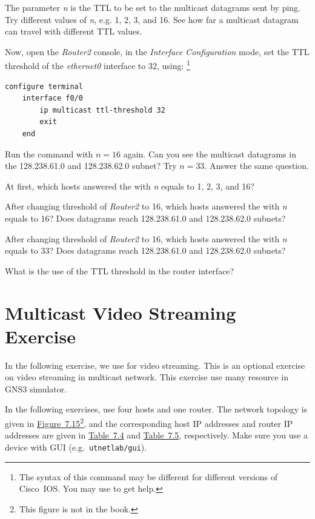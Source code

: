 \documentclass{../UTNetLab}
\begin{document}
The parameter \textit{n} is the TTL to be set to the multicast datagrams sent by ping.
Try different values of \textit{n}, e.g. 1, 2, 3, and 16.
See how far a multicast datagram can travel with different TTL values.

Now, open the \textit{Router2} console, in the \textit{Interface Configuration} mode, set the TTL threshold of the \textit{ethernet0} interface to 32, using:
\footnote{The syntax of this command may be different for different versions of Cisco~IOS.
    You may use  to get help.}

\begin{lstlisting}[language={cisco}]    
configure terminal
    interface f0/0
        ip multicast ttl-threshold 32
        exit
    end
\end{lstlisting}

Run the  command with $n = 16$ again.
Can you see the multicast datagrams in the 128.238.61.0 and 128.238.62.0 subnet?
Try $n = 33$.
Answer the same question.

\begin{report}
    \item At first, which hosts answered the  with \textit{n} equals to 1, 2, 3, and 16?
    \item After changing threshold of \textit{Router2} to 16, which hosts answered the  with \textit{n} equals to 16?
    Does datagrams reach 128.238.61.0 and 128.238.62.0 subnets?
    \item After changing threshold of \textit{Router2} to 16, which hosts answered the  with \textit{n} equals to 33?
    Does datagrams reach 128.238.61.0 and 128.238.62.0 subnets?

    \item What is the use of the TTL threshold in the router interface?
\end{report}

\part{Multicast Video Streaming Exercise}\label{sec:multicast-streaming}
In the following exercise, we use  for video streaming.
This is an optional exercise on video streaming in multicast network.
This exercise use many resource in GNS3 simulator.

In the following exercises, use four hosts and one router. The network topology is given in \hyperref[fig:7.15]{Figure~7.15}\footnote{This figure is not in the book.}, and the corresponding host IP addresses and router IP addresses are given in \hyperref[tab:7.4]{Table~7.4} and \hyperref[tab:7.5]{Table~7.5}, respectively.
Make sure you use a device with GUI (e.g.\ \texttt{utnetlab/gui}).
\end{document}
